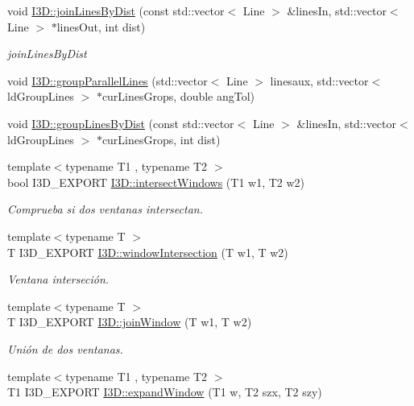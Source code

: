 \begin{DoxyCompactItemize}
void \hyperlink{group___geometric_entities_gac6db25c8f17cca3b2fd2f737efda6a5a}{I3\+D\+::join\+Lines\+By\+Dist} (const std\+::vector$<$ Line $>$ \&lines\+In, std\+::vector$<$ Line $>$ $\ast$lines\+Out, int dist)
\begin{DoxyCompactList}\small\item\em join\+Lines\+By\+Dist \end{DoxyCompactList}\item 
void \hyperlink{group___geometric_entities_gaa8733cce0398776f35f9dcdbb1a3c933}{I3\+D\+::group\+Parallel\+Lines} (std\+::vector$<$ Line $>$ linesaux, std\+::vector$<$ ld\+Group\+Lines $>$ $\ast$cur\+Lines\+Grops, double ang\+Tol)
\item 
void \hyperlink{group___geometric_entities_gadffdd08b45284c20785b162ee959f11f}{I3\+D\+::group\+Lines\+By\+Dist} (const std\+::vector$<$ Line $>$ \&lines\+In, std\+::vector$<$ ld\+Group\+Lines $>$ $\ast$cur\+Lines\+Grops, int dist)
\item 
{\footnotesize template$<$typename T1 , typename T2 $>$ }\\bool I3\+D\+\_\+\+E\+X\+P\+O\+RT \hyperlink{group___geometric_entities_ga16ec870ad1dfb5178445d023231183e8}{I3\+D\+::intersect\+Windows} (T1 w1, T2 w2)
\begin{DoxyCompactList}\small\item\em Comprueba si dos ventanas intersectan. \end{DoxyCompactList}\item 
{\footnotesize template$<$typename T $>$ }\\T I3\+D\+\_\+\+E\+X\+P\+O\+RT \hyperlink{group___geometric_entities_gaa929176ef49672b0bc0019c5fe58a017}{I3\+D\+::window\+Intersection} (T w1, T w2)
\begin{DoxyCompactList}\small\item\em Ventana interseción. \end{DoxyCompactList}\item 
{\footnotesize template$<$typename T $>$ }\\T I3\+D\+\_\+\+E\+X\+P\+O\+RT \hyperlink{group___geometric_entities_ga1aa105cebf6692e4e42f666bc8dd94c1}{I3\+D\+::join\+Window} (T w1, T w2)
\begin{DoxyCompactList}\small\item\em Unión de dos ventanas. \end{DoxyCompactList}\item 
{\footnotesize template$<$typename T1 , typename T2 $>$ }\\T1 I3\+D\+\_\+\+E\+X\+P\+O\+RT \hyperlink{group___geometric_entities_ga8ad6c6751aee604442e1a5287b1d0119}{I3\+D\+::expand\+Window} (T1 w, T2 szx, T2 szy)

\end{DoxyCompactItemize}

